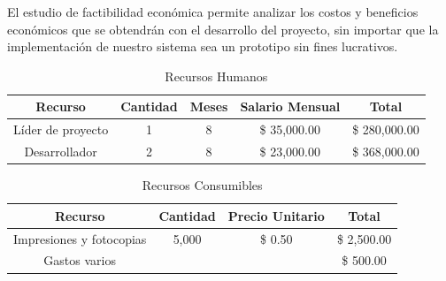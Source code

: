 El estudio de factibilidad económica permite analizar los costos y beneficios económicos que se obtendrán con el desarrollo del proyecto, sin importar que la implementación de nuestro sistema sea un prototipo sin fines lucrativos. 
\vspace{2cm}
\begin{table}[h]
	\begin{center}
		\begin{tabular}{|c|c|c|c|c|}
			\hline \rowcolor[RGB]{51,153,255} 
			\textcolor{blanco}{\bf Recurso} &
				\textcolor{blanco}{\bf Cantidad} &
				\textcolor{blanco}{\bf Meses} &
				\textcolor{blanco}{\bf Salario Mensual} &
				\textcolor{blanco}{\bf Total} \\
			\hline 
				Líder de proyecto &
				1 &
				8 &
				\$ 35,000.00 &
				\$ 280,000.00 \\
      		\hline \rowcolor[RGB]{240,248,255}
      			Desarrollador &
				2 &
				8 &
				\$ 23,000.00 &
				\$ 368,000.00 \\
      		\hline 
    		\end{tabular}
	\end{center}
	\caption[Recursos Humanos]{Recursos Humanos \cite{salarios}} 
	\label{tab:recursosHumanos}
\end{table}

\begin{table}[h]
	\begin{center}
		\begin{tabular}{|c|c|c|c|}
			\hline \rowcolor[RGB]{51,153,255} 
			\textcolor{blanco}{\bf Recurso} &
				\textcolor{blanco}{\bf Cantidad} &
				\textcolor{blanco}{\bf Precio Unitario} &
				\textcolor{blanco}{\bf Total} \\
			\hline
				Impresiones y fotocopias &
				5,000 &
				\$ 0.50 &
				\$ 2,500.00  \\
      		\hline \rowcolor[RGB]{240,248,255}
      			Gastos varios &
				&
				&
				\$ 500.00 \\
      		\hline 
    		\end{tabular}
	\end{center}
	\caption[Recursos Consumibles]{Recursos Consumibles} 
	\label{tab:recursosConsumibles}
\end{table}

